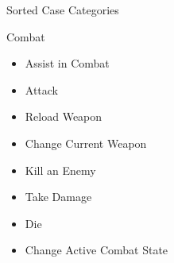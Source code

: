 \documentclass[12pt]{article}
\begin{document}
\begin{section}{Sorted Case Categories}
\begin{subsection}{Combat}
\begin{itemize}
\item Assist in Combat
\item Attack
\item Reload Weapon
\item Change Current Weapon
\item Kill an Enemy
\item Take Damage
\item Die
\item Change Active Combat State
\end{itemize}
\end{subsection}
\end{section}
\end{document}
